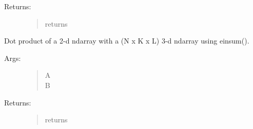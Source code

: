 \documentclass[letterpaper,10pt,english]{sphinxmanual}
\begin{document}
\begin{fulllineitems}
\begin{description}
\item[{Returns:}] \leavevmode\begin{quote}\begin{description}
\item[{returns}] \leavevmode
{}

\end{description}\end{quote}

\end{description}

\end{fulllineitems}


\begin{fulllineitems}
\label{\detokenize{utils:luxpy.utils.math.dot23}}
Dot product of a 2-d ndarray with a (N x K x L) 3-d ndarray 
using einsum().
\begin{description}
\item[{Args:}] \leavevmode\begin{quote}\begin{description}
\item[{A}] \leavevmode
{}

\item[{B}] \leavevmode
{}

\end{description}\end{quote}

\item[{Returns:}] \leavevmode\begin{quote}\begin{description}
\item[{returns}] \leavevmode
{}

\end{description}\end{quote}

\end{description}

\end{fulllineitems}
\end{document}
